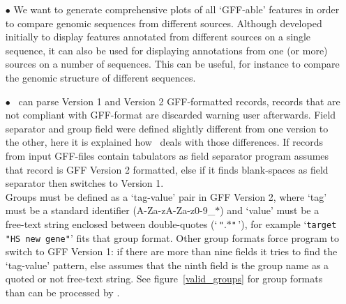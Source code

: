 \begin{itemize}
\item[$\bullet$] We want to generate comprehensive plots of all `GFF-able' features in order to compare genomic sequences from different sources. Although developed initially to display features annotated from different sources on a single sequence, it can also be used for displaying annotations from one (or more) sources on a number of sequences. This can be useful, for instance to compare the genomic structure of different sequences.
\item[$\bullet$] \prog\ can parse Version 1 and Version 2 GFF-formatted records, records that are not compliant with GFF-format are discarded warning user afterwards. Field separator and group field were defined slightly different from one version to the other, here it is explained how \prog\ deals with those differences.
If records from input GFF-files contain tabulators as field separator program assumes that record is GFF Version 2 formatted, else if it finds blank-spaces as field separator then switches to Version 1.\\
Groups must be defined as a `tag-value' pair in GFF Version 2, where `tag' must be a standard identifier (A-Za-zA-Za-z0-9\_$\ast$) and `value' must be a free-text string enclosed between double-quotes (`\,\texttt{"}.$\ast$\texttt{"}\,'), for example `\texttt{target "HS new gene"}' fits that group format. Other group formats force program to switch to GFF Version 1: if there are more than nine fields it tries to find the `tag-value' pattern, else assumes that the ninth field is the group name as a quoted or not free-text string. See figure~\ref{valid_groups} for group formats than can be processed by \prog.\\

\end{itemize}
